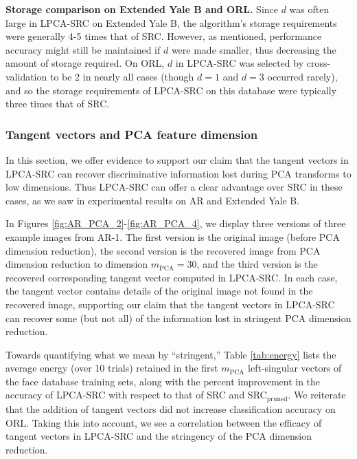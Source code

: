 \documentclass[review]{elsarticle}
\begin{document}
\textbf{Storage comparison on Extended Yale B and ORL.} Since $d$ was often large in LPCA-SRC on Extended Yale B, the algorithm's storage requirements were generally 4-5 times that of SRC. However, as mentioned, performance accuracy might still be maintained if $d$ were made smaller, thus decreasing the amount of storage required. On ORL, $d$ in LPCA-SRC was selected by cross-validation to be 2 in nearly all cases (though $d=1$ and $d=3$ occurred rarely), and so the storage requirements of LPCA-SRC on this database were typically three times that of SRC.






\subsubsection{Tangent vectors and PCA feature dimension} \label{sec:pca_tv}

In this section, we offer evidence to support our claim that the tangent vectors in LPCA-SRC can recover discriminative information lost during PCA transforms to low dimensions. Thus LPCA-SRC can offer a clear advantage over SRC in these cases, as we saw in experimental results on AR and Extended Yale B. 

In Figures \ref{fig:AR_PCA_2}-\ref{fig:AR_PCA_4}, we display three versions of three example images from AR-1. The first version is the original image (before PCA dimension reduction), the second version is the recovered image from PCA dimension reduction to dimension $m_\mathrm{PCA} = 30$, and the third version is the recovered corresponding tangent vector computed in LPCA-SRC. In each case, the tangent vector contains details of the original image not found in the recovered image, supporting our claim that the tangent vectors in LPCA-SRC can recover some (but not all) of the information lost in stringent PCA dimension reduction. 


Towards quantifying what we mean by ``stringent,'' Table \ref{tab:energy} lists the average energy (over 10 trials) retained in the first $m_\mathrm{PCA}$ left-singular vectors of the face database training sets, along with the percent improvement in the accuracy of LPCA-SRC with respect to that of SRC and SRC$_\mathrm{pruned}$. We reiterate that the addition of tangent vectors did not increase classification accuracy on ORL. Taking this into account, we see a correlation between the efficacy of tangent vectors in LPCA-SRC and the stringency of the PCA dimension reduction. 
\end{document}
